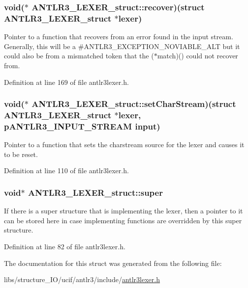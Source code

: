 \hypertarget{struct_a_n_t_l_r3___l_e_x_e_r__struct_a77fd0b4598ebb28edab46d9aab6e7143}{
\subsubsection[{recover}]{\setlength{\rightskip}{0pt plus 5cm}void($\ast$ A\-N\-T\-L\-R3\-\_\-\-L\-E\-X\-E\-R\-\_\-struct\-::recover)(struct {\bf A\-N\-T\-L\-R3\-\_\-\-L\-E\-X\-E\-R\-\_\-struct} $\ast$lexer)}}\label{struct_a_n_t_l_r3___l_e_x_e_r__struct_a77fd0b4598ebb28edab46d9aab6e7143}
Pointer to a function that recovers from an error found in the input stream. Generally, this will be a \#\-A\-N\-T\-L\-R3\-\_\-\-E\-X\-C\-E\-P\-T\-I\-O\-N\-\_\-\-N\-O\-V\-I\-A\-B\-L\-E\-\_\-\-A\-L\-T but it could also be from a mismatched token that the ($\ast$match)() could not recover from. 

Definition at line 169 of file antlr3lexer.\-h.

\hypertarget{struct_a_n_t_l_r3___l_e_x_e_r__struct_a5c28d84198fa94f172e35887f52c248f}{
\subsubsection[{set\-Char\-Stream}]{\setlength{\rightskip}{0pt plus 5cm}void($\ast$ A\-N\-T\-L\-R3\-\_\-\-L\-E\-X\-E\-R\-\_\-struct\-::set\-Char\-Stream)(struct {\bf A\-N\-T\-L\-R3\-\_\-\-L\-E\-X\-E\-R\-\_\-struct} $\ast$lexer, {\bf p\-A\-N\-T\-L\-R3\-\_\-\-I\-N\-P\-U\-T\-\_\-\-S\-T\-R\-E\-A\-M} {\bf input})}}\label{struct_a_n_t_l_r3___l_e_x_e_r__struct_a5c28d84198fa94f172e35887f52c248f}
Pointer to a function that sets the charstream source for the lexer and causes it to be reset. 

Definition at line 110 of file antlr3lexer.\-h.

\hypertarget{struct_a_n_t_l_r3___l_e_x_e_r__struct_ae500bd5337a874e4c753b614fafc1eec}{
\subsubsection[{super}]{\setlength{\rightskip}{0pt plus 5cm}void$\ast$ A\-N\-T\-L\-R3\-\_\-\-L\-E\-X\-E\-R\-\_\-struct\-::super}}\label{struct_a_n_t_l_r3___l_e_x_e_r__struct_ae500bd5337a874e4c753b614fafc1eec}
If there is a super structure that is implementing the lexer, then a pointer to it can be stored here in case implementing functions are overridden by this super structure. 

Definition at line 82 of file antlr3lexer.\-h.



The documentation for this struct was generated from the following file\-:\begin{DoxyCompactItemize}
\item 
libs/structure\-\_\-\-I\-O/ucif/antlr3/include/\hyperlink{antlr3lexer_8h}{antlr3lexer.\-h}\end{DoxyCompactItemize}
